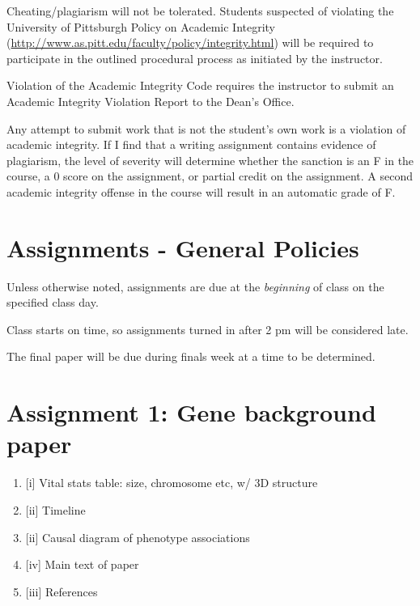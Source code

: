 \documentclass[
]{book}
\providecommand{\tightlist}{%
  \setlength{\itemsep}{0pt}\setlength{\parskip}{0pt}}
\begin{document}
Cheating/plagiarism will not be tolerated. Students suspected of violating the University of Pittsburgh Policy on Academic Integrity (\url{http://www.as.pitt.edu/faculty/policy/integrity.html}) will be required to participate in the outlined procedural process as initiated by the instructor.

Violation of the Academic Integrity Code requires the instructor to submit an Academic Integrity Violation Report to the Dean's Office.

Any attempt to submit work that is not the student's own work is a violation of academic integrity. If I find that a writing assignment contains evidence of plagiarism, the level of severity will determine whether the sanction is an F in the course, a 0 score on the assignment, or partial credit on the assignment. A second academic integrity offense in the course will result in an automatic grade of F.

\hypertarget{assignments---general-policies}{%
\chapter{Assignments - General Policies}\label{assignments---general-policies}}

Unless otherwise noted, assignments are due at the \emph{beginning} of class on the specified class day.

Class starts on time, so assignments turned in after 2 pm will be considered late.

The final paper will be due during finals week at a time to be determined.

\hypertarget{assignment-1-gene-background-paper}{%
\chapter{Assignment 1: Gene background paper}\label{assignment-1-gene-background-paper}}

\begin{enumerate}
\def\labelenumi{\arabic{enumi}.}
\tightlist
\item
  {[}i{]} Vital stats table: size, chromosome etc, w/ 3D structure
\item
  {[}ii{]} Timeline
\item
  {[}ii{]} Causal diagram of phenotype associations
\item
  {[}iv{]} Main text of paper
\item
  {[}iii{]} References
\end{enumerate}
\end{document}
